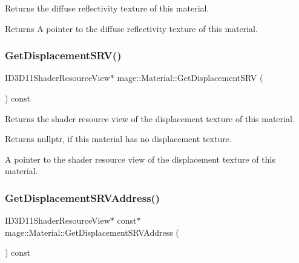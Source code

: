 Returns the diffuse reflectivity texture of this material.

\begin{DoxyReturn}{Returns}
A pointer to the diffuse reflectivity texture of this material. 
\end{DoxyReturn}
\hypertarget{structmage_1_1_material_a638ee0913aa0722f499c883b71549503}{}\label{structmage_1_1_material_a638ee0913aa0722f499c883b71549503} 
\subsubsection{\texorpdfstring{Get\+Displacement\+S\+R\+V()}{GetDisplacementSRV()}}
{\footnotesize\ttfamily I\+D3\+D11\+Shader\+Resource\+View$\ast$ mage\+::\+Material\+::\+Get\+Displacement\+S\+RV (\begin{DoxyParamCaption}{ }\end{DoxyParamCaption}) const\hspace{0.3cm}{\ttfamily [noexcept]}}

Returns the shader resource view of the displacement texture of this material.

\begin{DoxyReturn}{Returns}
{\ttfamily nullptr}, if this material has no displacement texture. 

A pointer to the shader resource view of the displacement texture of this material. 
\end{DoxyReturn}
\hypertarget{structmage_1_1_material_a7672015b558ebbaa52e070f65b052b2e}{}\label{structmage_1_1_material_a7672015b558ebbaa52e070f65b052b2e} 
\subsubsection{\texorpdfstring{Get\+Displacement\+S\+R\+V\+Address()}{GetDisplacementSRVAddress()}}
{\footnotesize\ttfamily I\+D3\+D11\+Shader\+Resource\+View$\ast$ const$\ast$ mage\+::\+Material\+::\+Get\+Displacement\+S\+R\+V\+Address (\begin{DoxyParamCaption}{ }\end{DoxyParamCaption}) const\hspace{0.3cm}{\ttfamily [noexcept]}}

